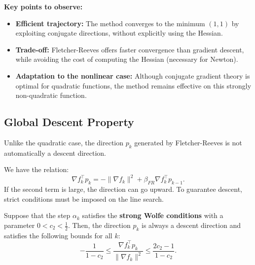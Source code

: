 \begin{figureexplanation}
\textbf{Key points to observe:}
\begin{itemize}
    \item \textbf{Efficient trajectory:} The method converges to the minimum $(1,1)$ by exploiting conjugate directions, without explicitly using the Hessian.
    \item \textbf{Trade-off:} Fletcher-Reeves offers faster convergence than gradient descent, while avoiding the cost of computing the Hessian (necessary for Newton).
    \item \textbf{Adaptation to the nonlinear case:} Although conjugate gradient theory is optimal for quadratic functions, the method remains effective on this strongly non-quadratic function.
\end{itemize}
\end{figureexplanation}

\subsection{Global Descent Property}

Unlike the quadratic case, the direction $p_k$ generated by Fletcher-Reeves is not automatically a descent direction.

We have the relation:
\[
\nabla f_k^\top p_k = -\|\nabla f_k\|^2 + \beta_{FR} \nabla f_k^\top p_{k-1}.
\]
If the second term is large, the direction can go upward. To guarantee descent, strict conditions must be imposed on the line search.

\begin{lemme}
Suppose that the step $\alpha_k$ satisfies the \textbf{strong Wolfe conditions} with a parameter $0 < c_2 < \frac{1}{2}$.
Then, the direction $p_k$ is always a descent direction and satisfies the following bounds for all $k$:
\[
-\frac{1}{1-c_2} \le \frac{\nabla f_k^\top p_k}{\|\nabla f_k\|^2} \le \frac{2c_2 - 1}{1-c_2}.
\]
\end{lemme}

